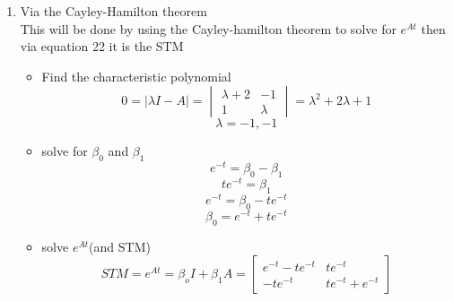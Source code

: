 \begin{enumerate}
  \item Via the Cayley-Hamilton theorem \\
    This will be done by using the Cayley-hamilton theorem to solve for $e^{At}$ then via equation 22 it is the
    STM
    \begin{itemize}
    \item Find the characteristic polynomial \\
      \begin{equation}
        0 = |\lambda I - A| =
        \begin{vmatrix}
          \lambda +2 & -1 \\
          1 & \lambda 
        \end{vmatrix} =
        \lambda^2 + 2\lambda + 1
      \end{equation}
      \begin{equation}
        \lambda = -1,-1
      \end{equation}
    \item solve for $\beta_0$ and $\beta_1$ \\
      \begin{equation}
        e^{-t} = \beta_0 - \beta_1
      \end{equation}
      \begin{equation}
        te^{-t} = \beta_1
      \end{equation}
      \begin{equation}
        e^{-t} = \beta_0 - te^{-t}
      \end{equation}
      \begin{equation}
        \beta_0 = e^{-t} + te^{-t}
      \end{equation}
    \item solve $e^{At}$(and STM)
      \begin{equation}
        STM = e^{At} = \beta_oI + \beta_1A =
        \begin{bmatrix}
          e^{-t} - te^{-t} & te^{-t}\\
          -te^{-t} & te^{-t} + e^{-t}
        \end{bmatrix}
      \end{equation}
    \end{itemize}
  \end{enumerate}